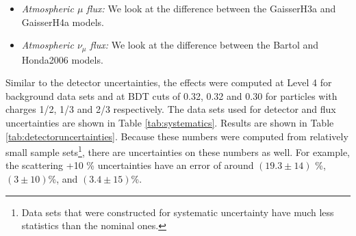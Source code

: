 \begin{enumerate}
\begin{itemize}
\item \textit{Atmospheric $\mu$ flux: }We look at the difference between the GaisserH3a \cite{Gaisser:2013bla} and GaisserH4a \cite{Gaisser:2011cc} models.
\item \textit{Atmospheric $\nu_\mu$ flux: }We look at the difference between the Bartol \cite{PhysRevD.70.023006} and Honda2006 \cite{Honda:2006qj} models.
\end{itemize}
Similar to the detector uncertainties, the effects were computed at Level 4 for background data sets and at BDT cuts of 0.32, 0.32 and 0.30 for particles with charges 1/2, 1/3 and 2/3 respectively. The data sets used for detector and flux uncertainties are shown in Table \ref{tab:systematics}. Results are shown in Table \ref{tab:detectoruncertainties}. Because these numbers were computed from relatively small sample sets\footnote{Data sets that were constructed for systematic uncertainty have much less statistics than the nominal ones.}, there are uncertainties on these numbers as well. For example, the scattering +10 \% uncertainties have an error of around $(19.3 \pm 14)$ \%, $(3 \pm 10)$\%, and $(3.4 \pm 15)$\%.


\end{enumerate}
